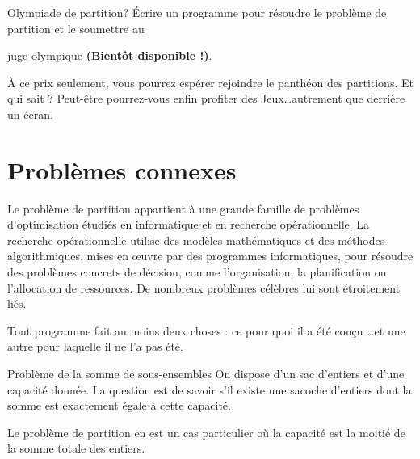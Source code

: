 \documentclass[a4paper,twoside]{article}
\begin{document}
    \begin{exercice}{Olympiade de partition}{?}
      Écrire un programme pour résoudre le problème de partition et le soumettre au
      \begin{center}
        \large
        \href{}{juge olympique} \textbf{(Bientôt disponible !)}.
      \end{center}

    \end{exercice}
    À ce prix seulement, vous pourrez espérer rejoindre le panthéon des partitions.
    Et qui sait ? Peut-être pourrez-vous enfin profiter des Jeux\dots autrement que derrière un écran.


    \section{Problèmes connexes}
    \label{sec:related}




    Le problème de partition appartient à une grande famille de problèmes d'optimisation étudiés en informatique et en recherche opérationnelle.
    La recherche opérationnelle utilise des modèles mathématiques et des méthodes algorithmiques, mises en \oe uvre par des programmes informatiques, pour résoudre des problèmes concrets de décision, comme l'organisation, la planification ou l'allocation de ressources.
De nombreux problèmes célèbres lui sont étroitement liés.
\begin{epigramme}
  Tout programme fait au moins deux choses : ce pour quoi il a été conçu \dots et une autre pour laquelle il ne l'a pas été.
\end{epigramme}


\begin{definition}{Problème de la somme de sous-ensembles}
  On dispose d'un sac d'entiers et d'une capacité donnée.
  La question est de savoir s'il existe une sacoche d'entiers dont la
  somme est exactement égale à cette capacité.

  Le problème de partition en est un cas particulier où la capacité est la moitié de la somme totale des entiers.
\end{definition}
\end{document}
